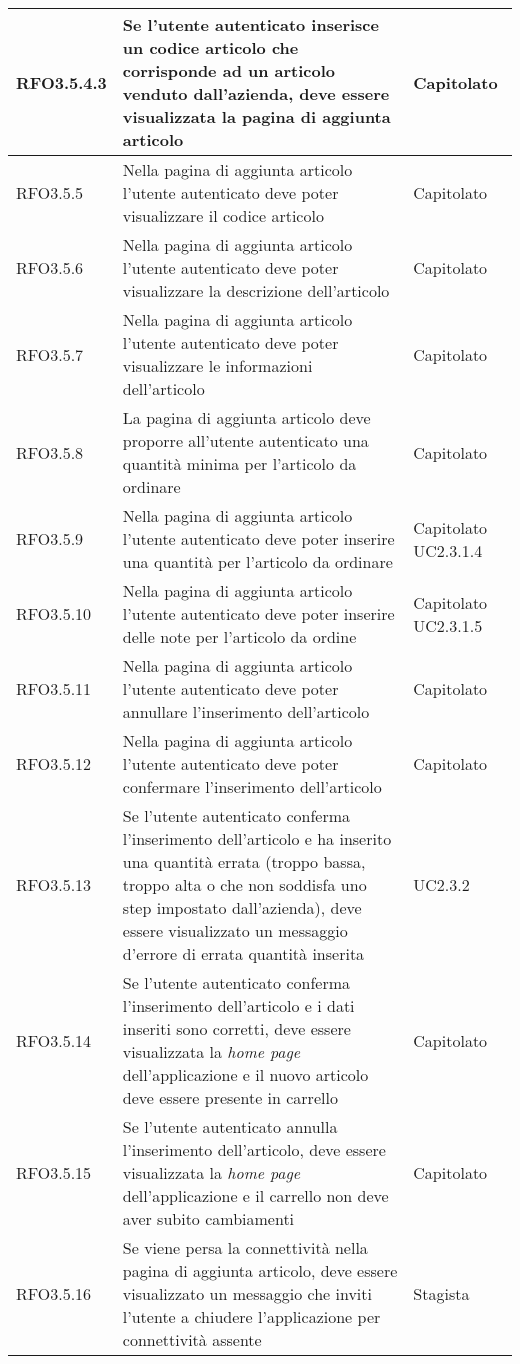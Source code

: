 {\begin{center}
\begin{longtable}{ | >{\centering\arraybackslash}p{2.5cm} | >{\arraybackslash}p{7cm} | >{\centering\arraybackslash}p{2cm} | }
RFO3.5.4.3 & Se l'utente autenticato inserisce un codice articolo che corrisponde ad un articolo venduto dall'azienda, deve essere visualizzata la pagina di aggiunta articolo & Capitolato \\ \hline
RFO3.5.5 & Nella pagina di aggiunta articolo l'utente autenticato deve poter visualizzare il codice articolo & Capitolato \\ \hline
RFO3.5.6 & Nella pagina di aggiunta articolo l'utente autenticato deve poter visualizzare la descrizione dell'articolo & Capitolato \\ \hline
RFO3.5.7 & Nella pagina di aggiunta articolo l'utente autenticato deve poter visualizzare le informazioni dell'articolo & Capitolato \\ \hline
RFO3.5.8 & La pagina di aggiunta articolo deve proporre all'utente autenticato una quantità minima per l'articolo da ordinare & Capitolato \\ \hline
RFO3.5.9 & Nella pagina di aggiunta articolo l'utente autenticato deve poter inserire una quantità per l'articolo da ordinare & Capitolato UC2.3.1.4 \\ \hline
RFO3.5.10 & Nella pagina di aggiunta articolo l'utente autenticato deve poter inserire delle note per l'articolo da ordine & Capitolato UC2.3.1.5\\ \hline
RFO3.5.11 & Nella pagina di aggiunta articolo l'utente autenticato deve poter annullare l'inserimento dell'articolo & Capitolato \\ \hline
RFO3.5.12 & Nella pagina di aggiunta articolo l'utente autenticato deve poter confermare l'inserimento dell'articolo & Capitolato \\ \hline
RFO3.5.13 & Se l'utente autenticato conferma l'inserimento dell'articolo e ha inserito una quantità errata (troppo bassa, troppo alta o che non soddisfa uno step impostato dall'azienda), deve essere visualizzato un messaggio d'errore di errata quantità inserita & UC2.3.2 \\ \hline
RFO3.5.14 & Se l'utente autenticato conferma l'inserimento dell'articolo e i dati inseriti sono corretti, deve essere visualizzata la \textit{home page} dell'applicazione e il nuovo articolo deve essere presente in carrello & Capitolato \\ \hline
RFO3.5.15 & Se l'utente autenticato annulla l'inserimento dell'articolo, deve essere visualizzata la \textit{home page} dell'applicazione e il carrello non deve aver subito cambiamenti & Capitolato \\ \hline
RFO3.5.16 & Se viene persa la connettività nella pagina di aggiunta articolo, deve essere visualizzato un messaggio che inviti l'utente a chiudere l'applicazione per connettività assente & Stagista \\ \hline

\end{longtable}
\end{center}}

